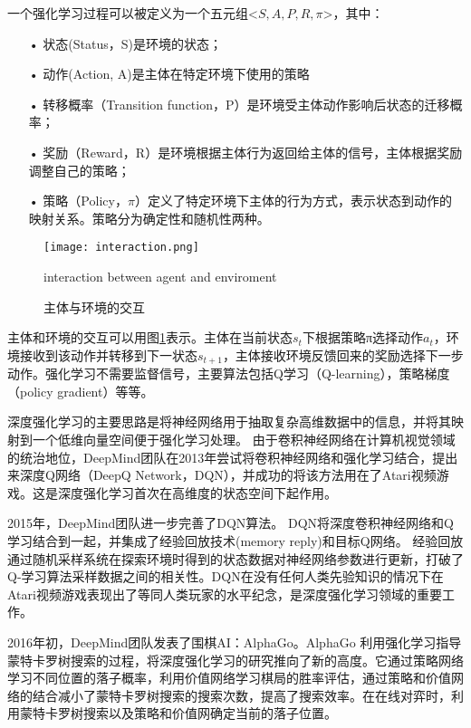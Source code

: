 一个强化学习过程可以被定义为一个五元组<$S, A, P, R, \pi$>，其中：
\begin{itemize}
  \item[•] 状态(Status，S)是环境的状态；
  \item[•] 动作(Action, A)是主体在特定环境下使用的策略
  \item[•] 转移概率（Transition function，P）是环境受主体动作影响后状态的迁移概率；
  \item[•] 奖励（Reward，R）是环境根据主体行为返回给主体的信号，主体根据奖励调整自己的策略；
  \item[•] 策略（Policy，$\pi$）定义了特定环境下主体的行为方式，表示状态到动作的映射关系。策略分为确定性和随机性两种。
\end{itemize}

\begin{figure}[!htbp]\centering
  \texttt{[image: interaction.png]}
  \caption{主体与环境的交互}{interaction between agent and enviroment}
  \label{fig:interaction}       %
\end{figure}

主体和环境的交互可以用图\ref{fig:interaction}表示。主体在当前状态$s_t$下根据策略π选择动作$a_t$，环境接收到该动作并转移到下一状态$s_{t+1}$，主体接收环境反馈回来的奖励选择下一步动作。强化学习不需要监督信号，主要算法包括Q学习（Q-learning），策略梯度（policy gradient）等等。

深度强化学习的主要思路是将神经网络用于抽取复杂高维数据中的信息，并将其映射到一个低维向量空间便于强化学习处理。
由于卷积神经网络在计算机视觉领域的统治地位，DeepMind团队在2013年尝试将卷积神经网络和强化学习结合，提出来深度Q网络（DeepQ Network，DQN）\cite{Mnih2013PlayingAW}，并成功的将该方法用在了Atari视频游戏。这是深度强化学习首次在高维度的状态空间下起作用。

2015年，DeepMind团队进一步完善了DQN算法\cite{Mnih2015HumanlevelCT}。
DQN将深度卷积神经网络和Q学习结合到一起，并集成了经验回放技术(memory reply)和目标Q网络。
经验回放通过随机采样系统在探索环境时得到的状态数据对神经网络参数进行更新，打破了Q-学习算法采样数据之间的相关性。DQN在没有任何人类先验知识的情况下在Atari视频游戏表现出了等同人类玩家的水平纪念，是深度强化学习领域的重要工作。

2016年初，DeepMind团队发表了围棋AI：AlphaGo\cite{Silver2016MasteringTG}。AlphaGo 利用强化学习指导蒙特卡罗树搜索的过程，将深度强化学习的研究推向了新的高度。它通过策略网络学习不同位置的落子概率，利用价值网络学习棋局的胜率评估，通过策略和价值网络的结合减小了蒙特卡罗树搜索的搜索次数，提高了搜索效率。在在线对弈时，利用蒙特卡罗树搜索以及策略和价值网确定当前的落子位置。

